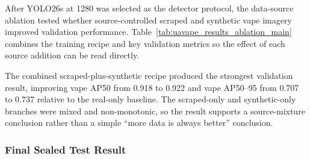 After YOLO26s at 1280 was selected as the detector protocol, the data-source ablation tested whether source-controlled scraped and synthetic vape imagery improved validation performance. Table~\ref{tab:uavape_results_ablation_main} combines the training recipe and key validation metrics so the effect of each source addition can be read directly.

\begin{table}[H]
\centering
\scriptsize
{}
\caption{Validation results from the V4 data-source ablation under the fixed YOLO26s@1280 protocol.}
\label{tab:uavape_results_ablation_main}
\end{table}

The combined scraped-plus-synthetic recipe produced the strongest validation result, improving vape AP50 from 0.918 to 0.922 and vape AP50--95 from 0.707 to 0.737 relative to the real-only baseline. The scraped-only and synthetic-only branches were mixed and non-monotonic, so the result supports a source-mixture conclusion rather than a simple ``more data is always better'' conclusion.

\subsubsection{Final Sealed Test Result}


